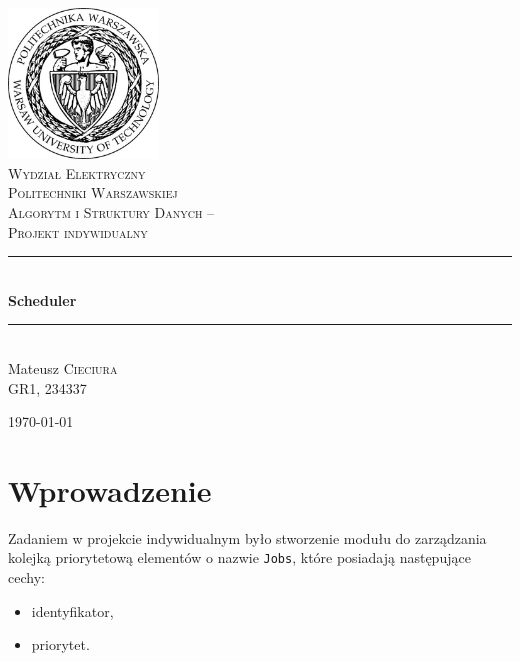 \documentclass[12pt,a4paper]{article}
\newcommand{\HRule}{\rule{\linewidth}{0.5mm}}
\begin{document}
\begin{titlepage}

  \begin{center}
    \includegraphics[width=0.3\textwidth]{img/logo.jpg}\\[1cm]
    
    \textsc{\LARGE Wydział Elektryczny \\ Politechniki Warszawskiej}\\[1.5cm]
    
    \large \textsc{Algorytm i Struktury Danych -- \\ Projekt indywidualny}\\[0.5cm]

    \HRule \\[0.4cm]
    {\huge \bfseries Scheduler }\\[0.2cm]
    \HRule \\[1.5cm]
   
    {\large
    Mateusz \textsc{Cieciura} \\ GR1, 234337}
    
    \vfill

    {\large \today}
  \end{center}

\end{titlepage}

\tableofcontents

\section{Wprowadzenie}

Zadaniem w projekcie indywidualnym było stworzenie modułu do zarządzania kolejką priorytetową elementów o nazwie \texttt{Jobs}, które posiadają następujące cechy:

\begin{itemize}
	\item identyfikator,
	\item priorytet.
\end{itemize}
\end{document}

